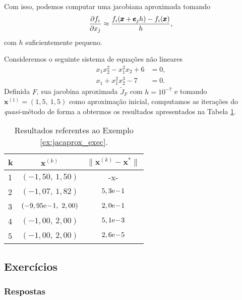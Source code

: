 Com isso, podemos computar uma jacobiana aproximada tomando
\begin{equation}
  \frac{\partial f_i}{\partial x_j} \approx \frac{f_i(\pmb{x}+\pmb{e}_jh) - f_i(\pmb{x})}{h},
\end{equation}
com $h$ suficientemente pequeno.

\begin{ex}\label{ex:jacaprox_exec}
  Consideremos o seguinte sistema de equações não lineares
  \begin{align}
    x_1x_2^2 - x_1^2x_2 + 6 &= 0,\\
    x_1 + x_1^2x_2^3 - 7 &= 0.
  \end{align}
  Definida $F$, sua jacobina aproximada $\tilde{J}_F$ com $h=10^{-7}$ e tomando $\pmb{x}^{(1)} = (1,5,~1,5)$ como aproximação inicial, computamos as iterações do {\it quasi}-método de forma a obtermos os resultados apresentados na Tabela \ref{tab:ex_jacaprox_exec}.

  \begin{table}[h!]
    \centering
    \begin{tabular}{lcc}
      k & $\pmb{x}^{(k)}$ & $\|\pmb{x}^{(k)} - \pmb{x}^*\|$\\\hline
      1 & $(-1,50,~1,50)$ & -x- \\
      2 & $(-1,07,~1,82)$ & $5,3\mathrm{e}\!-\!1$\\
      3 & $(-9,95\mathrm{e}\!-\!1,~2,00)$ & $2,0\mathrm{e}\!-\!1$\\
      4 & $(-1,00,~2,00)$ & $5,1\mathrm{e}\!-\!3$\\
      5 & $(-1,00,~2,00)$ & $2,6\mathrm{e}\!-\!5$\\\hline
    \end{tabular}
    \caption{Resultados referentes ao Exemplo \ref{ex:jacaprox_exec}.}
    \label{tab:ex_jacaprox_exec}
  \end{table}

% 
\end{ex}

\subsection{Exercícios}

\badgeConstrucao

\ifisbook
\subsubsection{Respostas}
\shipoutAnswer
\fi

